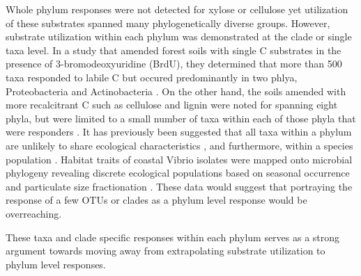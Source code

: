 Whole phylum responses were not detected for xylose or cellulose yet utilization of these substrates spanned many phylogenetically diverse groups. However, substrate utilization within each phylum was demonstrated at the clade or single taxa level. In a study that amended forest soils with single C substrates in the presence of 3-bromodeoxyuridine (BrdU), they determined that more than 500 taxa responded to labile C but occured predominantly in two phlya, Proteobacteria and Actinobacteria \cite{Goldfarb_2011}. On the other hand, the soils amended with more recalcitrant C such as cellulose and lignin were noted for spanning eight phyla, but were limited to a small number of taxa within each of those phyla that were responders \cite{Goldfarb_2011}. It has previously been suggested that all taxa within a phylum are unlikely to share ecological characteristics \cite{Fierer_2007}, and furthermore, within a species population \cite{Choudoir_2012,Preheim_2011,Hunt_2008}. Habitat traits of coastal Vibrio isolates were mapped onto microbial phylogeny revealing discrete ecological populations based on seasonal occurrence and particulate size fractionation \cite{Preheim_2011,Hunt_2008}. These data would suggest that portraying the response of a few OTUs or clades as a phylum level response would be overreaching.    

These taxa and clade specific responses within each phylum serves as a strong argument towards moving away from extrapolating substrate utilization to phylum level responses.

